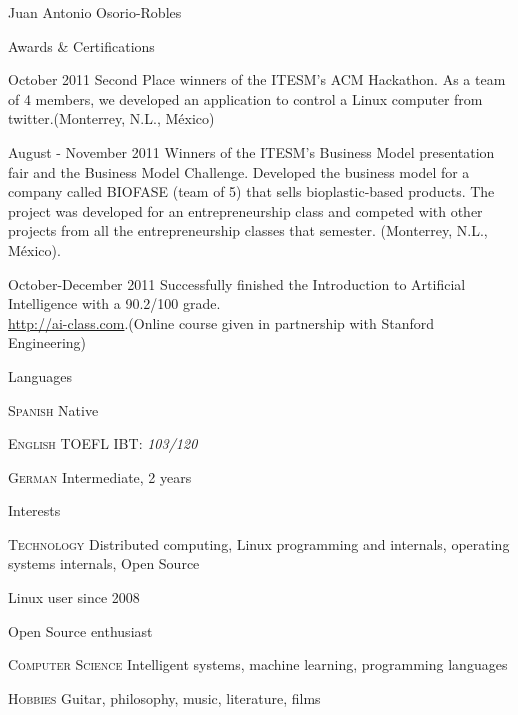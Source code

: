 \documentclass[spanish,10pt,letterpaper]{article}
\begin{document}
\begin{cv}{Juan Antonio Osorio-Robles}
	\begin{cvlist}{Awards \& Certifications}
		\item [October 2011] Second Place winners of the ITESM's ACM Hackathon. As a team of 4 members, we developed an application to control a Linux computer from twitter.(Monterrey, N.L., M\'{e}xico)
		\item [August - November 2011] Winners of the ITESM's Business Model presentation fair and the Business Model Challenge. Developed the business model for a company called BIOFASE (team of 5) that sells bioplastic-based products. The project was developed for an entrepreneurship class and competed with other projects from all the entrepreneurship classes that semester. (Monterrey, N.L., M\'{e}xico).
		\item [October-December 2011] Successfully finished the Introduction to Artificial Intelligence with a 90.2/100 grade. \\
		\href{http://ai-class.com}{http://ai-class.com}.(Online course given in partnership with Stanford Engineering)
	\end{cvlist}


	\begin{cvlist}{Languages}
		\item [\textsc {Spanish}]
				Native
		\item [\textsc {English}]
				TOEFL IBT: \emph{103/120}
		\item [\textsc {German}]
				Intermediate, 2 years
		\end{cvlist}

	\begin{cvlist}{Interests}
		\item [\textsc {Technology}]
				Distributed computing, Linux programming and internals, operating systems internals, Open Source
		\item [  ] Linux user since 2008
		\item [  ] Open Source enthusiast
		\item [\textsc {Computer Science}]
				Intelligent systems, machine learning, programming languages
		\item [\textsc {Hobbies}]
				Guitar, philosophy, music, literature, films
	\end{cvlist}


\end{cv}
\end{document}
